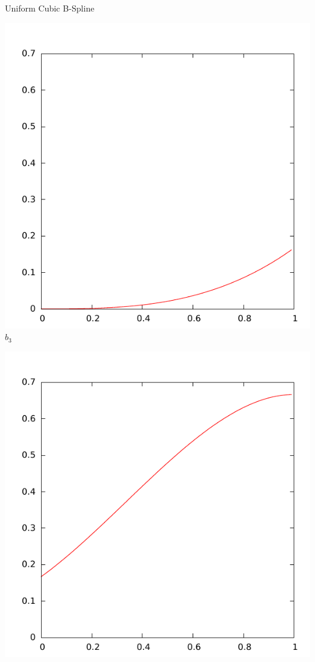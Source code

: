 \documentclass{beamer}
\begin{document}
\begin{frame}{Uniform Cubic B-Spline}
  \begin{minipage}{0.25\columnwidth}
    \centering
    \includegraphics[width=\columnwidth]{b3.pdf}\\
    $b_3$
  \end{minipage}%
  \begin{minipage}{0.25\columnwidth}
    \centering
    \includegraphics[width=\columnwidth]{b2.pdf}\\

\end{minipage}
\end{frame}
\end{document}

